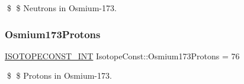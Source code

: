 \$ \$ Neutrons in Osmium-\/173. \mbox{\label{group___isotope_const-_osmium-_os173_gad1babe99c95fa21ae2cb068de69795e3}} 
\subsubsection{\texorpdfstring{Osmium173\+Protons}{Osmium173Protons}}
{\footnotesize\ttfamily \mbox{\hyperlink{group___isotope_const-_macros_ga5f18360b3e99483a35c32d789e62621c}{I\+S\+O\+T\+O\+P\+E\+C\+O\+N\+S\+T\+\_\+\+I\+NT}} Isotope\+Const\+::\+Osmium173\+Protons = 76}

\$ \$ Protons in Osmium-\/173. 